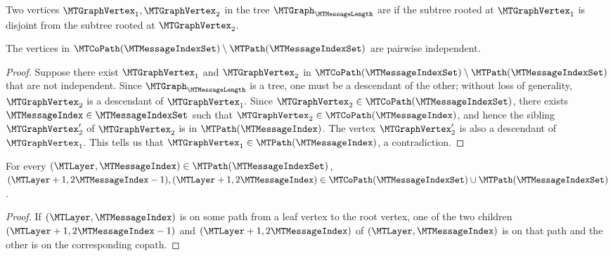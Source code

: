 \begin{definition}
\label{definition:independent-vertices-in-tree}
Two vertices $\MTGraphVertex_{1},\MTGraphVertex_{2}$ in the tree $\MTGraph_{\MTMessageLength}$ are  if the subtree rooted at $\MTGraphVertex_{1}$ is disjoint from the subtree rooted at $\MTGraphVertex_{2}$.
\end{definition}

\begin{claim}
\label{claim:copaths-minus-paths-are-independent}
The vertices in $\MTCoPath(\MTMessageIndexSet) \setminus \MTPath(\MTMessageIndexSet)$ are pairwise independent.
\end{claim}

\begin{proof}
Suppose there exist $\MTGraphVertex_{1}$ and $\MTGraphVertex_{2}$ in $\MTCoPath(\MTMessageIndexSet) \setminus \MTPath(\MTMessageIndexSet)$ that are not independent. Since $\MTGraph_{\MTMessageLength}$ is a tree, one must be a descendant of the other; without loss of generality, $\MTGraphVertex_{2}$ is a descendant of $\MTGraphVertex_{1}$. Since $\MTGraphVertex_{2} \in \MTCoPath(\MTMessageIndexSet)$, there exists $\MTMessageIndex \in \MTMessageIndexSet$ such that $\MTGraphVertex_{2} \in \MTCoPath(\MTMessageIndex)$, and hence the sibling $\MTGraphVertex_{2}'$ of $\MTGraphVertex_{2}$ is in $\MTPath(\MTMessageIndex)$. The vertex $\MTGraphVertex_{2}'$ is also a descendant of $\MTGraphVertex_{1}$. This tells us that $\MTGraphVertex_{1} \in \MTPath(\MTMessageIndex)$, a contradiction.
\end{proof}

\begin{claim}
\label{claim:in-paths-are-determined}
For every $(\MTLayer,\MTMessageIndex) \in \MTPath(\MTMessageIndexSet)$, $(\MTLayer+1,2\MTMessageIndex-1),(\MTLayer+1,2\MTMessageIndex) \in \MTCoPath(\MTMessageIndexSet) \cup \MTPath(\MTMessageIndexSet)$.
\end{claim}

\begin{proof}
If $(\MTLayer,\MTMessageIndex)$ is on some path from a leaf vertex to the root vertex,
one of the two children $(\MTLayer+1,2\MTMessageIndex-1)$ and $(\MTLayer+1,2\MTMessageIndex)$ of $(\MTLayer,\MTMessageIndex)$ is on that path and the other is on the corresponding copath.
\end{proof}

